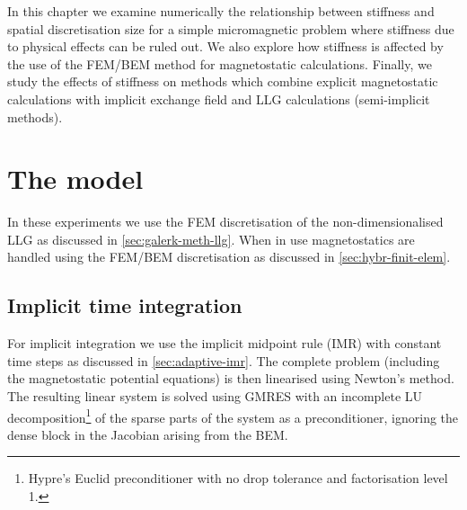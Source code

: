 In this chapter we examine numerically the relationship between stiffness and spatial discretisation size for a simple micromagnetic problem where stiffness due to physical effects can be ruled out.
We also explore how stiffness is affected by the use of the FEM/BEM method for magnetostatic calculations.
Finally, we study the effects of stiffness on methods which combine explicit magnetostatic calculations with implicit exchange field and LLG calculations (\ie semi-implicit methods).

\section{The model}

In these experiments we use the FEM discretisation of the non-dimensionalised LLG as discussed in \cref{sec:galerk-meth-llg}.
When in use magnetostatics are handled using the FEM/BEM discretisation as discussed in \cref{sec:hybr-finit-elem}.

\subsection{Implicit time integration}
For implicit integration we use the implicit midpoint rule (IMR) with constant time steps as discussed in \cref{sec:adaptive-imr}.
The complete problem (including the magnetostatic potential equations) is then linearised using Newton's method.
The resulting linear system is solved using GMRES with an incomplete LU decomposition\footnote{Hypre's Euclid preconditioner\cite{hypre} with no drop tolerance and factorisation level 1.} of the sparse parts of the system as a preconditioner, ignoring the dense block in the Jacobian arising from the BEM.

